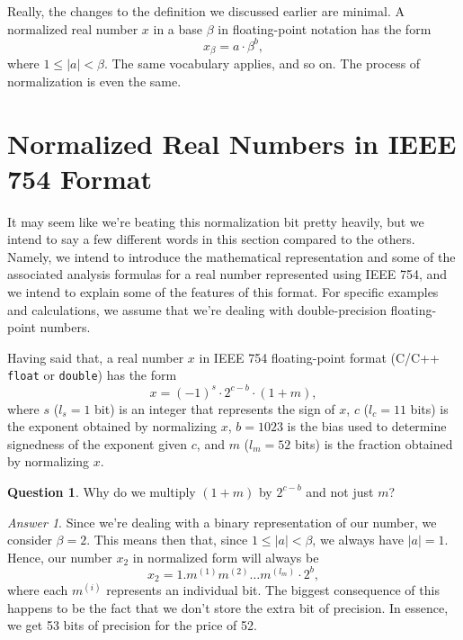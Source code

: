 \documentclass[letterpaper,12pt]{article}
\theoremstyle{remark}
\newtheorem*{ansa}{Answer}
\theoremstyle{definition}
\newtheorem*{quea}{Question}
\begin{document}
Really, the changes to the definition we discussed earlier are
minimal.  A normalized real number $x$ in a base $\beta$ in
floating-point notation has the form
\begin{equation}
  x_\beta= a \cdot \beta^b,
\end{equation}
where $1\leq \left | a \right | < \beta$.  The same vocabulary
applies, and so on.  The process of normalization is even the same.

\section{Normalized Real Numbers in IEEE 754 Format}

It may seem like we're beating this normalization bit pretty heavily,
but we intend to say a few different words in this section compared to
the others.  Namely, we intend to introduce the mathematical
representation and some of the associated analysis formulas for a real
number represented using IEEE 754, and we intend to explain some of
the features of this format.  For specific examples and calculations,
we assume that we're dealing with double-precision floating-point
numbers.

Having said that, a real number $x$ in IEEE 754 floating-point format
(C/C++ {\tt float} or {\tt double}) has the form
\begin{equation}
  \label{ieee754_form}
  x=(-1)^s \cdot 2^{c-b}\cdot (1+m),
\end{equation}
where $s$ ($l_s=1$ bit) is an integer that represents the sign of $x$,
$c$ ($l_c=11$ bits) is the exponent obtained by normalizing $x$,
$b=1023$ is the bias used to determine signedness of the exponent
given $c$, and $m$ ($l_m=52$ bits) is the fraction obtained by
normalizing $x$.

\begin{quea}
  Why do we multiply $(1 + m)$ by $2^{c-b}$ and not just $m$?
\end{quea}
\begin{ansa}
  Since we're dealing with a binary representation of our number, we
  consider $\beta = 2$.  This means then that, since $1\leq \left | a
  \right | < \beta$, we always have $\left | a \right | = 1$.  Hence,
  our number $x_2$ in normalized form will always be
  \begin{equation*}
    x_2=1.m^{(1)}m^{(2)}\ldots m^{(l_m)}\cdot 2^b,
  \end{equation*}
  where each $m^{(i)}$ represents an individual bit.  The biggest
  consequence of this happens to be the fact that we don't store the
  extra bit of precision.  In essence, we get 53 bits of precision for
  the price of 52.
\end{ansa}
\end{document}
